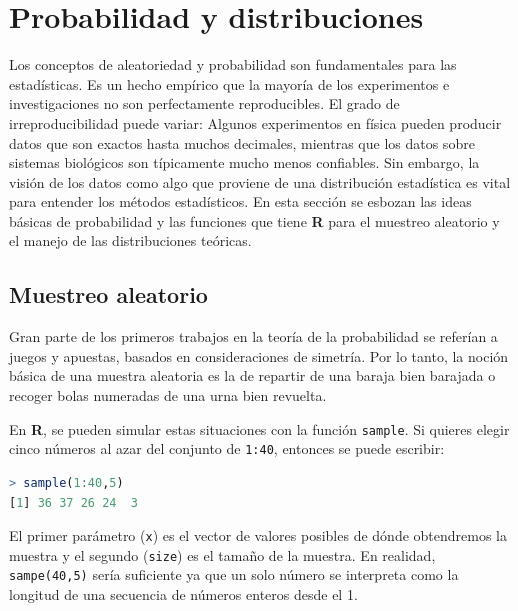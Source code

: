 \chapter{Probabilidad y distribuciones}

Los conceptos de aleatoriedad y probabilidad son fundamentales para las
estadísticas. Es un hecho empírico que la mayoría de los experimentos e
investigaciones no son perfectamente reproducibles. El grado de
irreproducibilidad puede variar: Algunos experimentos en física pueden producir
datos que son exactos hasta muchos decimales, mientras que los datos sobre
sistemas biológicos son típicamente mucho menos confiables. Sin embargo, la
visión de los datos como algo que proviene de una distribución estadística es
vital para entender los métodos estadísticos. En esta sección se esbozan las
ideas básicas de probabilidad y las funciones que tiene \textbf{R} para el
muestreo aleatorio y el manejo de las distribuciones teóricas.

\section{Muestreo aleatorio}

Gran parte de los primeros trabajos en la teoría de la probabilidad se referían
a juegos y apuestas, basados en consideraciones de simetría. Por lo tanto, la
noción básica de una  muestra aleatoria es la de repartir de una baraja bien
barajada o recoger bolas numeradas de una urna bien revuelta.

En \textbf{R}, se pueden simular estas situaciones con la función
\texttt{sample}. Si quieres elegir cinco números al azar del conjunto de
\texttt{1:40}, entonces se puede escribir:

\begin{lstlisting}[language=R]
> sample(1:40,5)
[1] 36 37 26 24  3
\end{lstlisting}

El primer parámetro (\texttt{x}) es el vector de valores posibles de dónde
obtendremos la muestra y el segundo (\texttt{size}) es el tamaño de la muestra.
En realidad, \texttt{sampe(40,5)} sería suficiente ya que un solo número se
interpreta como la longitud de una secuencia de números enteros desde el 1.

